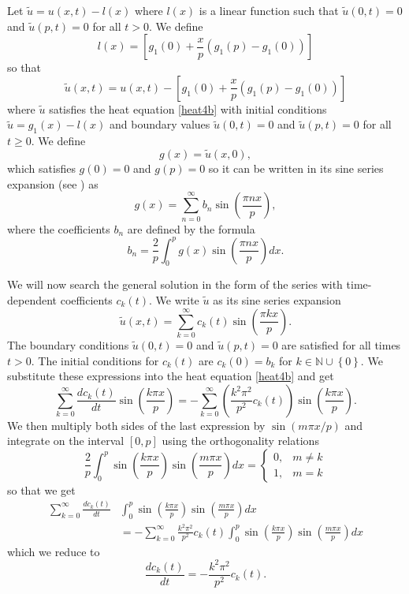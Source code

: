 \documentclass[00main.tex]{subfiles}
\begin{document}
Let $\tilde{u} = u(x,t) -l(x)$ where $l(x)$ is a linear function such that $\tilde{u}(0,t)=0$ and $\tilde{u}(p,t)=0$ for all $t>0$. We define \[ l(x) = \left[g_1(0) +\frac{x}{p} \left(g_1(p) - g_1(0)\right) \right] \] so that \[ \tilde{u}(x,t) = u(x,t) - \left[g_1(0) +\frac{x}{p} \left(g_1(p) - g_1(0)\right) \right] \] where $\tilde{u}$ satisfies the heat equation \eqref{heat4b} with initial conditions $\tilde{u} = g_1(x)-l(x)$ and boundary values $\tilde{u} (0,t) = 0$ and $\tilde{u}(p,t) = 0$ for all $t\geq 0$. We define \[g(x) = \tilde{u}(x,0),\] which satisfies $g(0)=0$ and $g(p)=0$ so it can be written in its sine series expansion (see \cite{tolstov}) as
 \[g(x) = \sum_{n=0}^\infty b_n \sin \left( \frac{\pi nx}{p} \right), \] where the coefficients $b_n$ are defined by the formula \[ b_n = \frac{2}{p} \int_0^p g(x) \sin \left( \frac{\pi nx}{p} \right) dx. \] 

We will now search the general solution in the form of the series with time-dependent coefficients $c_k(t)$. We write $\tilde{u}$ as its sine series expansion \[ \tilde{u} (x,t) = \sum_{k=0}^\infty c_k(t) \sin \left( \frac{\pi kx}{p} \right). \] The boundary conditions $\tilde{u}(0,t) = 0$ and $ \tilde{u}(p,t)=0$ are satisfied for all times $t>0$. The initial conditions for $c_k (t)$ are $c_k(0) = b_k$ for $k \in \mathbb{N} \cup \left\lbrace 0 \right\rbrace$. We substitute these expressions into the heat equation \eqref{heat4b} and get \[ \sum_{k=0}^\infty \frac{dc_k(t)}{dt} \sin \left( \frac{k\pi x}{p} \right) = - \sum_{k=0}^\infty \left( \frac{k^2 \pi^2}{p^2} c_k(t) \right) \sin \left( \frac{k\pi x}{p} \right). \] We then multiply both sides of the last expression by $\sin \left( m\pi x/p \right)$ and integrate on the interval $[0,p]$ using the orthogonality relations \[ \frac{2}{p} \int_0^p \sin \left( \frac{k\pi x}{p} \right) \sin \left( \frac{m\pi x}{p} \right) dx = \left\lbrace \begin{array}{ll}
0, & m\neq k\\
1, & m=k
\end{array} \right. \] so that we get \begin{align*}
\sum_{k=0}^\infty \frac{dc_k(t)}{dt} & \int_0^p \sin \left( \frac{k\pi x}{p} \right) \sin \left( \frac{m\pi x}{p} \right) dx\\ &= - \sum_{k=0}^\infty \frac{k^2 \pi^2}{p^2} c_k(t) \int_0^p \sin \left( \frac{k\pi x}{p} \right) \sin \left( \frac{m\pi x}{p} \right) dx
\end{align*} which we reduce to \[ \frac{dc_k (t)}{dt} = - \frac{k^2 \pi^2}{p^2} c_k (t). \]
\end{document}
